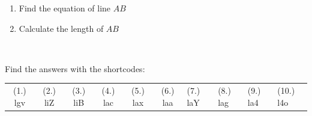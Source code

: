 \begin{eocexercises}{}
\begin{enumerate}[noitemsep, label=\textbf{\arabic*}. ]
 \begin{enumerate}[noitemsep, label=\textbf{(\alph*)} ]
\item Find the equation of line $AB$ 
\item Calculate the length of $AB$
\end{enumerate}
\end{enumerate}
\
\par {} Find the answers with the shortcodes:
\par \begin{tabular}[h]{cccccc}
(1.) lgv  &  (2.) liZ  &  (3.) liB  &  (4.) lac  &  (5.) lax  &  (6.) laa  &  (7.) laY  &  (8.) lag  &  (9.) la4  &  (10.) l4o  & \end{tabular}
\end{eocexercises}